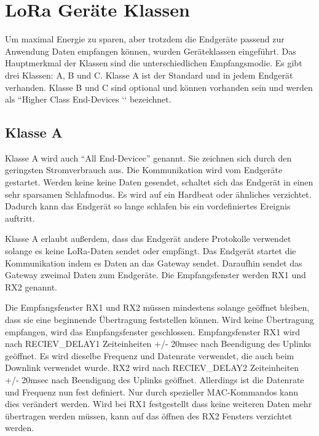 \documentclass[a4paper, 12pt]{article}
\begin{document}
    \section{LoRa Geräte Klassen} \label{sec:klassen}
        Um maximal Energie zu sparen, aber trotzdem die Endgeräte passend zur Anwendung Daten empfangen können, 
        wurden Geräteklassen eingeführt. Das Hauptmerkmal der Klassen sind die unterschiedlichen Empfangsmodie. 
        Es gibt drei Klassen: A, B und C. Klasse A ist der Standard und in jedem Endgerät verhanden. Klasse B 
        und C sind optional und können vorhanden sein und werden als ``Higher Class End-Devices ‘‘ bezeichnet. \cite[S.10]{LoRaSpec}
        \subsection{Klasse A}\label{sec:ClassA}
            Klasse A wird auch ``All End-Devicec'' genannt. Sie zeichnen sich durch den geringsten Stromverbrauch aus. Die 
            Kommunikation wird vom Endgeräte gestartet. Werden keine keine Daten gesendet, schaltet sich 
            das Endgerät in einen sehr sparsamen Schlafmodus. Es wird auf ein Hardbeat oder ähnliches verzichtet.
            Dadurch kann das Endgerät so lange schlafen bis ein vordefiniertes Ereignis auftritt. 
            
            Klasse A erlaubt außerdem, dass das Endgerät andere Protokolle verwendet solange es keine LoRa-Daten sendet 
            oder empfängt. \cite[S.11 ff.]{LoRaSpec} Das Endgerät startet 
            die Kommunikation indem es Daten an das Gateway sendet. Daraufhin sendet das Gateway zweimal 
            Daten zum Endgeräte. Die Empfangsfenster werden RX1 und RX2 genannt. 

            Die Empfangsfenster RX1 und RX2 müssen mindestens solange geöffnet bleiben, dass sie eine beginnende 
            Übertragung feststellen können. Wird keine Übertragung empfangen, wird das Empfangsfenster 
            geschlossen. Empfangsfenster RX1 wird nach RECIEV\_DELAY1 Zeiteinheiten +/- 20msec nach Beendigung des 
            Uplinks geöffnet. Es wird dieselbe Frequenz und Datenrate verwendet, die auch beim Downlink verwendet 
            wurde. 
            RX2 wird nach RECIEV\_DELAY2 Zeiteinheiten +/- 20msec nach Beendigung des Uplinks geöffnet. Allerdings
            ist die Datenrate und Frequenz nun fest definiert. Nur durch spezieller MAC-Kommandos kann dies verändert werden.
            Wird bei RX1 festgestellt dass keine weiteren Daten mehr übertragen werden müssen, 
            kann auf das öffnen des RX2 Fensters verzichtet werden.
            
\end{document}

